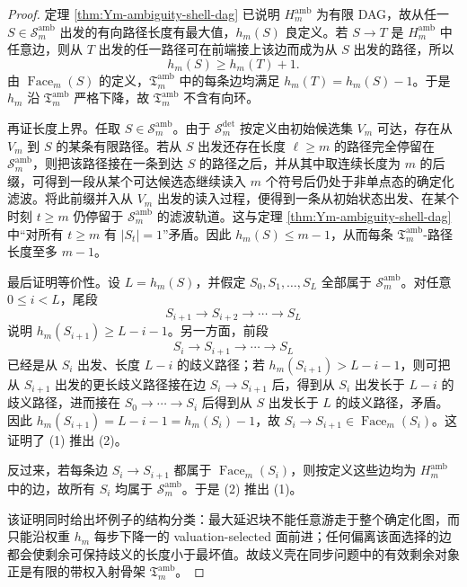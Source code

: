 \begin{proof}
定理 \ref{thm:Ym-ambiguity-shell-dag} 已说明 \(H_m^{\mathrm{amb}}\) 为有限 DAG，故从任一 \(S\in\mathcal S_m^{\mathrm{amb}}\) 出发的有向路径长度有最大值，\(h_m(S)\) 良定义。若 \(S\to T\) 是 \(H_m^{\mathrm{amb}}\) 中任意边，则从 \(T\) 出发的任一路径可在前端接上该边而成为从 \(S\) 出发的路径，所以
\[
 h_m(S)\ge h_m(T)+1.
\]
由 \(\operatorname{Face}_m(S)\) 的定义，\(\mathfrak T_m^{\mathrm{amb}}\) 中的每条边均满足 \(h_m(T)=h_m(S)-1\)。于是 \(h_m\) 沿 \(\mathfrak T_m^{\mathrm{amb}}\) 严格下降，故 \(\mathfrak T_m^{\mathrm{amb}}\) 不含有向环。

再证长度上界。任取 \(S\in\mathcal S_m^{\mathrm{amb}}\)。由于 \(\mathcal S_m^{\mathrm{det}}\) 按定义由初始候选集 \(V_m\) 可达，存在从 \(V_m\) 到 \(S\) 的某条有限路径。若从 \(S\) 出发还存在长度 \(\ell\ge m\) 的路径完全停留在 \(\mathcal S_m^{\mathrm{amb}}\)，则把该路径接在一条到达 \(S\) 的路径之后，并从其中取连续长度为 \(m\) 的后缀，可得到一段从某个可达候选态继续读入 \(m\) 个符号后仍处于非单点态的确定化滤波。将此前缀并入从 \(V_m\) 出发的读入过程，便得到一条从初始状态出发、在某个时刻 \(t\ge m\) 仍停留于 \(\mathcal S_m^{\mathrm{amb}}\) 的滤波轨道。这与定理 \ref{thm:Ym-ambiguity-shell-dag} 中“对所有 \(t\ge m\) 有 \(|S_t|=1\)”矛盾。因此 \(h_m(S)\le m-1\)，从而每条 \(\mathfrak T_m^{\mathrm{amb}}\)-路径长度至多 \(m-1\)。

最后证明等价性。设 \(L=h_m(S)\)，并假定 \(S_0,S_1,\ldots,S_L\) 全部属于 \(\mathcal S_m^{\mathrm{amb}}\)。对任意 \(0\le i<L\)，尾段
\[
 S_{i+1}\to S_{i+2}\to\cdots\to S_L
\]
说明 \(h_m(S_{i+1})\ge L-i-1\)。另一方面，前段
\[
 S_i\to S_{i+1}\to\cdots\to S_L
\]
 已经是从 \(S_i\) 出发、长度 \(L-i\) 的歧义路径；若 \(h_m(S_{i+1})>L-i-1\)，则可把从 \(S_{i+1}\) 出发的更长歧义路径接在边 \(S_i\to S_{i+1}\) 后，得到从 \(S_i\) 出发长于 \(L-i\) 的歧义路径，进而接在 \(S_0\to\cdots\to S_i\) 后得到从 \(S\) 出发长于 \(L\) 的歧义路径，矛盾。因此 \(h_m(S_{i+1})=L-i-1=h_m(S_i)-1\)，故 \(S_i\to S_{i+1}\in\operatorname{Face}_m(S_i)\)。这证明了 (1) 推出 (2)。

反过来，若每条边 \(S_i\to S_{i+1}\) 都属于 \(\operatorname{Face}_m(S_i)\)，则按定义这些边均为 \(H_m^{\mathrm{amb}}\) 中的边，故所有 \(S_i\) 均属于 \(\mathcal S_m^{\mathrm{amb}}\)。于是 (2) 推出 (1)。

该证明同时给出坏例子的结构分类：最大延迟块不能任意游走于整个确定化图，而只能沿权重 \(h_m\) 每步下降一的 valuation-selected 面前进；任何偏离该面选择的边都会使剩余可保持歧义的长度小于最坏值。故歧义壳在同步问题中的有效剩余对象正是有限的带权入射骨架 \(\mathfrak T_m^{\mathrm{amb}}\)。
\end{proof}

